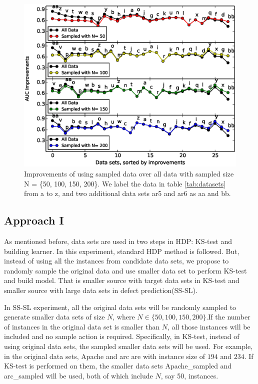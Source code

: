 \begin{figure}[!htp]
	\centering
	\includegraphics[width=\linewidth]{Figures/raleigh/sample_random.eps}
	\caption{Improvements of using sampled data over all data with sampled size N = \{50, 100, 150, 200\}. We label the data in table \ref{tab:datasets} from a to z, and two additional data sets ar5 and ar6 as aa and bb.}
	\label{fig:small_data}
\end{figure}

\subsection{Approach I}

As mentioned before, data sets are used in two steps in HDP: KS-test and building learner. In this experiment, standard HDP method is followed. But, instead of using all the instances from candidate data sets, we propose to randomly sample the original data and use smaller data set to perform KS-test and build model. That is smaller source with target data sets in KS-test and smaller source with large data sets in defect prediction(SS-SL).

In SS-SL experiment, all the original data sets will be randomly sampled to generate smaller data sets of size $N$, where $N \in \{50, 100, 150, 200\}$.If the number of instances in the original data set is smaller than $N$, all those instances will be included and no sample action is required. Specifically, in KS-test, instead of using original data sets, the sampled smaller data sets will be used. For example, in the original data sets, Apache and arc are with instance size of $194$ and $234$. If KS-test is performed on them, the smaller data sets Apache\_sampled and arc\_sampled will be used, both of which include $N$, say 50, instances. 

